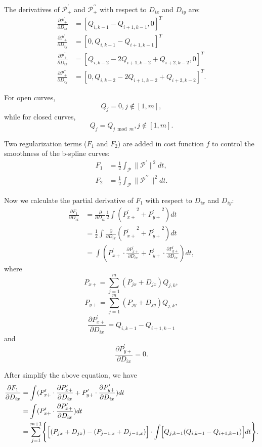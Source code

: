 \documentclass[11pt]{article}
\newcommand{\bmmp}{\bm{\mathcal{P}}} %
\newcommand{\half}{\frac{1}{2}}
\begin{document}
The derivatives of $\bmmp_+^{\prime}$ and $\bmmp_+^{\prime\prime}$ with respect to $D_{ix}$ and $D_{iy}$ are:
\[
\begin{split}
\frac{\partial{\bmmp_+^{\prime}}}{\partial{D_{ix}}}
&= [Q_{i,k-1}-Q_{i+1,k-1} , 0]^T \\
\frac{\partial{\bmmp_+^{\prime}}}{\partial{D_{iy}}}
&= [0 , Q_{i,k-1}-Q_{i+1,k-1}]^T \\
\frac{\partial{\bmmp_+^{\prime\prime}}}{\partial{D_{ix}}}
&= [Q_{i,k-2}-2Q_{i+1,k-2}+Q_{i+2,k-2} , 0]^T \\
\frac{\partial{\bmmp_+^{\prime\prime}}}{\partial{D_{iy}}}
&= [0 , Q_{i,k-2}-2Q_{i+1,k-2}+Q_{i+2,k-2}]^T.
\end{split}
\]

For open curves, 
\[
Q_j=0, j \notin [1,m],
\]
while for closed curves, 
\[
Q_j = Q_{j \bmod m}, j \notin [1,m].
\]


Two regularization terms ($F_1$ and $F_2$) are added in cost function $f$ to control the smoothness of the b-spline curves:
\[
\begin{split}
F_1 &= \half\int_{\bmmp}{\|\bmmp^{\prime}\|^2}dt ,\\
F_2 &= \half\int_{\bmmp}{\|\bmmp^{\prime\prime}\|^2}dt .
\end{split}
\]

Now we calculate the partial derivative of $F_1$ with respect to $D_{ix}$ and $D_{iy}$:
\[
\begin{split}
\frac{\partial{F_1}}{\partial{D_{ix}}}
&= \frac{\partial}{\partial{D_{ix}}}\half\int({{P_{x+}^{\prime}}^2+{P_{y+}^{\prime}}^2})dt \\
&= \half\int\frac{\partial}{\partial{D_{ix}}}({P_{x+}^{\prime}}^2+{P_{y+}^{\prime}}^2)dt \\
&= \int(P^{\prime}_{x+}\cdot \frac{\partial{P^{\prime}_{x+}}}{\partial{D_{ix}}} + P^{\prime}_{y+}\cdot \frac{\partial{P^{\prime}_{y+}}}{\partial{D_{ix}}})dt ,
\end{split}
\]
where
\[
P_{x+} = \sum_{j=1}^m(P_{jx}+D_{jx})Q_{j,k},
\]
\[
P_{y+} = \sum_{j=1}^m(P_{jy}+D_{jy})Q_{j,k},
\]
\[
\frac{\partial{P^{\prime}_{x+}}}{\partial{D_{ix}}} = Q_{i,k-1}-Q_{i+1,k-1}
\]
and
\[
\frac{\partial{P^{\prime}_{y+}}}{\partial{D_{ix}}} = 0.
\]

After simplify the above equation, we have
\[
\begin{split}
\frac{\partial{F_1}}{\partial{D_{ix}}}
&= \int(P^{\prime}_{x+}\cdot \frac{\partial{P^{\prime}_{x+}}}{\partial{D_{ix}}} + P^{\prime}_{y+}\cdot \frac{\partial{P^{\prime}_{y+}}}{\partial{D_{ix}}})dt \\
&= \int(P^{\prime}_{x+}\cdot \frac{\partial{P^{\prime}_{x+}}}{\partial{D_{ix}}})dt \\
&= \sum_{j=1}^{m+1}\Biggl\{\Bigl[(P_{jx}+D_{jx})-(P_{j-1,x}+D_{j-1,x})\Bigr] \cdot \int\Bigl[Q_{j,k-1}(Q_{i,k-1}-Q_{i+1,k-1})\Bigr]dt\Biggr\}.
\end{split}
\]
\end{document}
